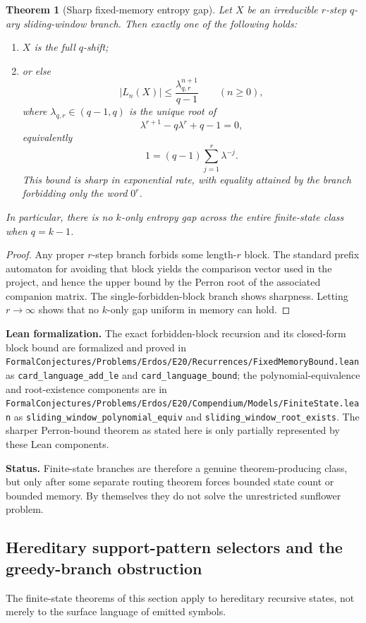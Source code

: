 \documentclass[11pt]{article}
\newtheorem{theorem}{Theorem}[section]
\theoremstyle{definition}
\newcommand{\1}{\mathbf{1}}
\newcommand{\status}[1]{\par\smallskip\noindent\textbf{Status.} #1\par\smallskip}
\newcommand{\leannote}[1]{\par\smallskip\noindent\textbf{Lean formalization.} #1\par\smallskip}
\begin{document}
\begin{theorem}[Sharp fixed-memory entropy gap]\label{thm:finite-state-fixed-order}
Let $X$ be an irreducible $r$-step $q$-ary sliding-window branch. Then exactly one of the following holds:
\begin{enumerate}[label=(\roman*),leftmargin=2.2em]
\item $X$ is the full $q$-shift;
\item or else
\[
|L_n(X)|\le \frac{\lambda_{q,r}^{n+1}}{q-1}
\qquad (n\ge 0),
\]
where $\lambda_{q,r}\in(q-1,q)$ is the unique root of
\[
\lambda^{r+1}-q\lambda^r+q-1=0,
\]
equivalently
\[
1=(q-1)\sum_{j=1}^r \lambda^{-j}.
\]
This bound is sharp in exponential rate, with equality attained by the branch forbidding only the word $0^r$.
\end{enumerate}
In particular, there is no $k$-only entropy gap across the entire finite-state class when $q=k-1$.
\end{theorem}

\begin{proof}
Any proper $r$-step branch forbids some length-$r$ block. The standard prefix automaton for avoiding that block yields the comparison vector used in the project, and hence the upper bound by the Perron root of the associated companion matrix. The single-forbidden-block branch shows sharpness. Letting $r\to\infty$ shows that no $k$-only gap uniform in memory can hold.
\end{proof}

\leannote{The exact forbidden-block recursion and its closed-form block bound are formalized and proved in \texttt{FormalConjectures/Problems/Erdos/E20/Recurrences/FixedMemoryBound.lean} as \texttt{card\_language\_add\_le} and \texttt{card\_language\_bound}; the polynomial-equivalence and root-existence components are in \texttt{FormalConjectures/Problems/Erdos/E20/Compendium/Models/FiniteState.lean} as \texttt{sliding\_window\_polynomial\_equiv} and \texttt{sliding\_window\_root\_exists}. The sharper Perron-bound theorem as stated here is only partially represented by these Lean components.}

\status{Finite-state branches are therefore a genuine theorem-producing class, but only after some separate routing theorem forces bounded state count or bounded memory. By themselves they do not solve the unrestricted sunflower problem.}



\subsection*{Hereditary support-pattern selectors and the greedy-branch obstruction}
The finite-state theorems of this section apply to hereditary recursive states, not merely to the surface language of emitted symbols.
\end{document}
